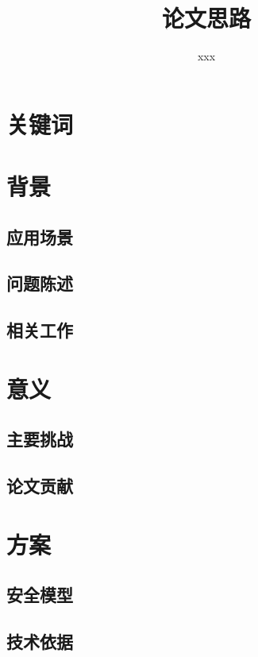 \documentclass[UTF8]{ctexart}
\title{论文思路}
\author{xxx}
\begin{document}
\maketitle
\section{关键词}

\section{背景}
\subsection{应用场景}

\subsection{问题陈述}

\subsection{相关工作}

\section{意义}
\subsection{主要挑战}

\subsection{论文贡献}

\section{方案}
\subsection{安全模型}

\subsection{技术依据}
\end{document}
